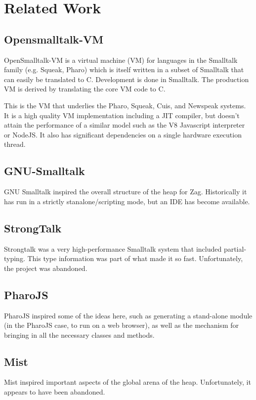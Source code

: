 \documentclass[
]{ceurart}
\begin{document}
\section{Related Work}
\subsection{Opensmalltalk-VM\cite{10.1145/3281287.3281295,opensmalltalk-github}}\label{openst}
OpenSmalltalk-VM is a virtual machine (VM) for languages in the Smalltalk family (e.g. Squeak, Pharo) which is itself written in a subset of Smalltalk that can easily be translated to C.
Development is done in Smalltalk.
The production VM is derived by translating the core VM code to C.

This is the VM that underlies the Pharo, Squeak, Cuis, and Newspeak systems.
It is a high quality VM implementation including a JIT compiler, but doesn't attain the performance of a similar model such as the V8 Javascript interpreter or NodeJS.
It also has significant dependencies on a single hardware execution thread.

\subsection{GNU-Smalltalk\cite{gnu-st}}\label{gnu-st}
GNU Smalltalk inspired the overall structure of the heap for Zag.
Historically it has run in a strictly stanalone/scripting mode, but an IDE has become available.

\subsection{StrongTalk\cite{10.1145/165854.165893}}\label{strongtalk}
Strongtalk was a very high-performance Smalltalk system that included partial-typing.
This type information was part of what made it so fast.
Unfortunately, the project was abandoned.

\subsection{PharoJS\cite{pharojs}}\label{pharojs}
PharoJS inspired some of the ideas here, such as generating a stand-alone module (in the PharoJS case, to run on a web browser), as well as the mechanism for bringing in all the necessary classes and methods.

\subsection{Mist\cite{mist-smalltalk}}\label{mist}
Mist inspired important aspects of the global arena of the heap. Unfortunately, it appears to have been abandoned.
\end{document}
